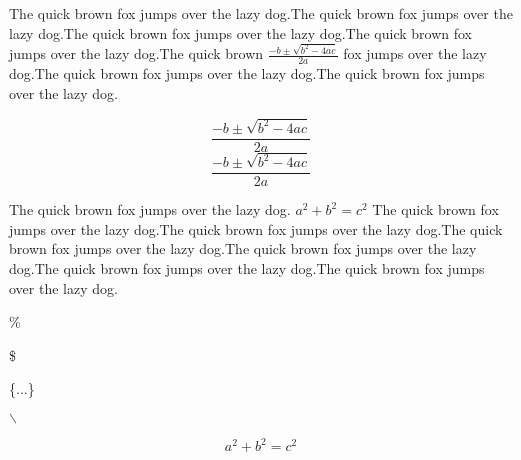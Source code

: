 \documentclass{article} %
\begin{document}
The quick brown fox jumps over the lazy dog.The quick brown fox jumps over the lazy dog.The quick brown fox jumps over the lazy dog.The quick brown fox jumps over the lazy dog.The quick brown 
$\frac{{- b \pm \sqrt {{b^2} - 4ac} }}{2a}$ fox jumps over the lazy dog.The quick brown fox jumps over the lazy dog.The quick brown fox jumps over the lazy dog.

$$\frac{{- b \pm \sqrt {{b^2} - 4ac} }}{2a}$$       %
\[\frac{{- b \pm \sqrt {{b^2}  -4ac} }}{2a}\]

The quick brown fox jumps over the lazy dog. $a^2+b^2=c^2$ The quick brown fox jumps over the lazy dog.The quick brown fox jumps over the lazy dog.The quick brown fox jumps over the lazy dog.The quick brown fox jumps over the lazy dog.The quick brown fox jumps over the lazy dog.The quick brown fox jumps over the lazy dog.

\% %

\$ %

\{...\}  %

$\backslash$    %

$$a^2+b^2=c^2$$ %
\end{document}
